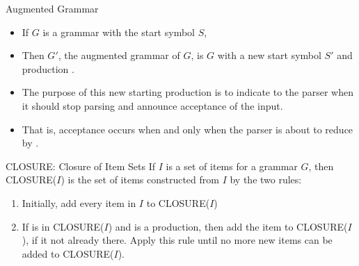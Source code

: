 \begin{bibunit}[apalike]
\begin{frame}{Augmented Grammar}
	\begin{itemize}
	\item If $G$ is a grammar with the start symbol $S$,
	\vfill
	\item Then $G'$, the augmented grammar of $G$, is $G$ with a new start symbol $S'$ and production .
	\vfill
	\item The purpose of this new starting production is to indicate to the parser when it should stop parsing and announce acceptance of the input.
	\vfill
	\item That is, acceptance occurs when and only when the parser is about to reduce by .
	\end{itemize}
\end{frame}

\begin{frame}{CLOSURE: Closure of Item Sets}
	If $I$ is a set of items for a grammar $G$, then CLOSURE($I$) is the set of items constructed from $I$ by the two rules:
	\begin{enumerate}
	\vfill
	\item Initially, add every item in $I$ to CLOSURE($I$)
	\vfill
	\item If  is in CLOSURE($I$) and  is a production, then add the item  to CLOSURE($I$), if it not already there. Apply this rule until no more new items can be added to CLOSURE($I$).
	\end{enumerate}
\end{frame}



\end{bibunit}
